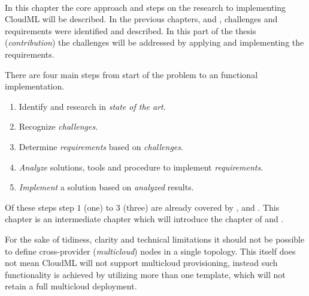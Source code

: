 \hr 

 \\
In this chapter the core approach and steps on the research to implementing CloudML will be described.
In the previous chapters,  and , 
challenges and requirements were identified and described.
In this part of the thesis (\emph{contribution}) the challenges will be addressed 
by applying and implementing the requirements.

There are four main steps from start of the problem to an functional implementation.
\begin{enumerate}
  \item Identify and research in \emph{state of the art}.
  \item Recognize \emph{challenges}.
  \item Determine \emph{requirements} based on \emph{challenges}.
  \item \emph{Analyze} solutions, tools and procedure to implement \emph{requirements}.
  \item \emph{Implement} a solution based on \emph{analyzed} results.
\end{enumerate}
Of these steps step $1$ (one) to $3$ (three) are already covered by 
,  and .
This chapter is an intermediate chapter which will introduce the chapter of 
and .


For the sake of tidiness, clarity and technical limitations it 
should not be possible to define cross-provider (\emph{multicloud}) nodes in a single topology.
This itself does not mean CloudML will not support multicloud provisioning,
instead such functionality is achieved by utilizing more than one template,
which will not retain a full multicloud deployment.
